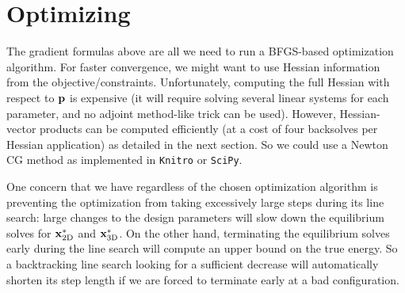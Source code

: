 \documentclass[10pt]{article}
\renewcommand{\vec}[1]{{\bf #1}}
\def\p{\vec{p}}
\def\xflat{\vec{x}^*_\text{2D}}
\def\xdeploy{\vec{x}^*_\text{3D}}
\begin{document}
\section{Optimizing}
The gradient formulas above are all we need to run a BFGS-based optimization
algorithm. For faster convergence, we might want to use Hessian information from the objective/constraints.
Unfortunately, computing the full Hessian with respect to $\p$ is expensive (it will require solving
several linear systems for each parameter, and no adjoint method-like trick can be used).
However, Hessian-vector products can be computed efficiently (at a
cost of four backsolves per Hessian application) as detailed in the next section. So we could use a Newton CG method as implemented in \texttt{Knitro}
or \texttt{SciPy}.

One concern that we have regardless of the chosen optimization algorithm is preventing the
optimization from taking excessively large steps during its line search: large changes to the
design parameters will slow down the equilibrium solves for $\xflat$ and $\xdeploy$.
On the other hand, terminating the equilibrium solves early during the line search will compute
an upper bound on the true energy. So a backtracking line search looking for a sufficient decrease will
automatically shorten its step length if we are forced to terminate early at a bad configuration.
\end{document}
